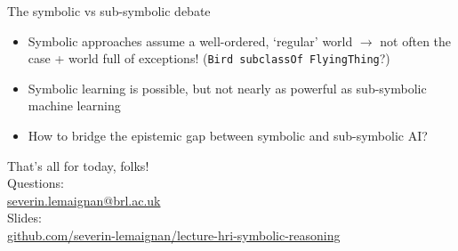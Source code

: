 \documentclass[compress,xcolor=table]{beamer}
\makeatletter
\def\beamer@writeslidentry@miniframesoff{%
  \expandafter\beamer@ifempty\expandafter{\beamer@framestartpage}{}%
  {%
    \clearpage\beamer@notesactions%
  }
}
\newcommand*{\miniframesoff}{\let\beamer@writeslidentry=\beamer@writeslidentry@miniframesoff}
\newcommand{\stmt}[1]{{\footnotesize \tt  #1}}
\makeatother
\begin{document}
\miniframesoff

\begin{frame}{The symbolic vs sub-symbolic debate}

    \begin{itemize}
        \item Symbolic approaches assume a well-ordered, `regular' world
            $\rightarrow$ not often the case + world full of exceptions!
            (\stmt{Bird subclassOf FlyingThing}?)
        \item Symbolic learning is possible, but not nearly as powerful as
            sub-symbolic machine learning
        \item How to bridge the epistemic gap between symbolic and sub-symbolic
            AI?
    \end{itemize}
\end{frame}


\begin{frame}{}
    \begin{center}
        \Large
        That's all for today, folks!\\[2em]
        \normalsize
        Questions:\\
        \url{severin.lemaignan@brl.ac.uk} \\[1em]

        Slides:\\
        \href{https://github.com/severin-lemaignan/lecture-hri-symbolic-reasoning}{\small
        github.com/severin-lemaignan/lecture-hri-symbolic-reasoning}

    \end{center}
\end{frame}
\end{document}
